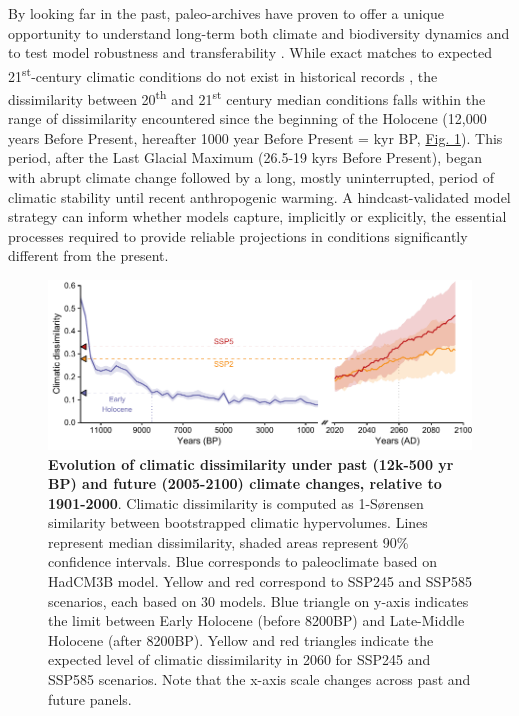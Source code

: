 \documentclass[pdflatex, sn-nature]{sn-jnl}%
\begin{document}
By looking far in the past, paleo-archives have proven to offer a unique opportunity to understand long-term both climate and biodiversity dynamics \cite{Fordham2020} and to test model robustness and transferability  \cite{Braconnot2012, Maguire2015}. While exact matches to expected 21\textsuperscript{st}-century climatic conditions do not exist in historical records \cite{Burke2018}, the dissimilarity between 20\textsuperscript{th} and 21\textsuperscript{st} century median conditions falls within the range of dissimilarity encountered since the beginning of the Holocene (12,000 years Before Present, hereafter 1000 year Before Present = kyr BP, \hyperref[climatic_dissimilarity]{Fig. 1}). This period, after the Last Glacial Maximum (26.5-19 kyrs Before Present), began with abrupt climate change followed by a long, mostly uninterrupted, period of climatic stability until recent anthropogenic warming. A hindcast-validated model strategy can inform whether models capture, implicitly or explicitly, the essential processes required to provide reliable projections in conditions significantly different from the present. 

\begin{figure}[ht]
\centering
\hspace*{-0.6in}
\includegraphics[scale=1]{climatic_dissimilarity.pdf}
\caption{\textbf{Evolution of climatic dissimilarity under past (12k-500 yr BP) and future (2005-2100) climate changes, relative to 1901-2000}. Climatic dissimilarity is computed as 1-Sørensen similarity between bootstrapped climatic hypervolumes. Lines represent median dissimilarity, shaded areas represent 90\% confidence intervals. Blue corresponds to paleoclimate based on HadCM3B model. Yellow and red correspond to SSP245 and SSP585 scenarios, each based on 30 models. Blue triangle on y-axis indicates the limit between Early Holocene (before 8200BP) and Late-Middle Holocene (after 8200BP). Yellow and red triangles indicate the expected level of climatic dissimilarity in 2060 for SSP245 and SSP585 scenarios. Note that the x-axis scale changes across past and future panels.}\label{climatic_dissimilarity}
\end{figure}
\end{document}
